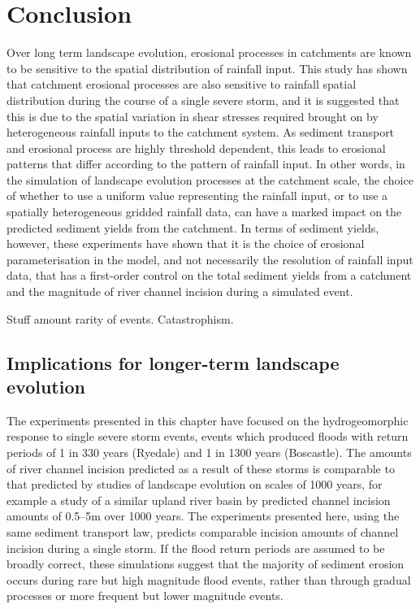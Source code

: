 \section{Conclusion}
Over long term landscape evolution, erosional processes in catchments are known to be sensitive to the spatial distribution of rainfall input.  This study has shown that catchment erosional processes are also sensitive to rainfall spatial distribution during the course of a single severe storm, and it is suggested that this is due to the spatial variation in shear stresses required brought on by heterogeneous rainfall inputs to the catchment system.  As sediment transport and erosional process are highly threshold dependent, this leads to erosional patterns that differ according to the pattern of rainfall input. In other words, in the simulation of landscape evolution processes at the catchment scale, the choice of whether to use a uniform value representing the rainfall input, or to use a spatially heterogeneous gridded rainfall data, can have a marked impact on the predicted sediment yields from the catchment. 
In terms of sediment yields, however, these experiments have shown that it is the choice of erosional parameterisation in the model, and not necessarily the resolution of rainfall input data, that has a first-order control on the total sediment yields from a catchment and the magnitude of river channel incision during a simulated event.

Stuff amount rarity of events. Catastrophism.

\subsection{Implications for longer-term landscape evolution}
The experiments presented in this chapter have focused on the hydrogeomorphic response to single severe storm events, events which produced floods with return periods of 1 in 330 years (Ryedale) and 1 in 1300 years (Boscastle). The amounts of river channel incision predicted as a result of these storms is comparable to that predicted by studies of landscape evolution on scales of 1000 years, for example a study of a similar upland river basin by \citep{coulthard2016sensitivity} predicted channel incision amounts of 0.5--5m over 1000 years. The experiments presented here, using the same sediment transport law, predicts comparable incision amounts of channel incision during a single storm. If the flood return periods are assumed to be broadly correct, these simulations suggest that the majority of sediment erosion occurs during rare but high magnitude flood events, rather than through gradual processes or more frequent but lower magnitude events.


